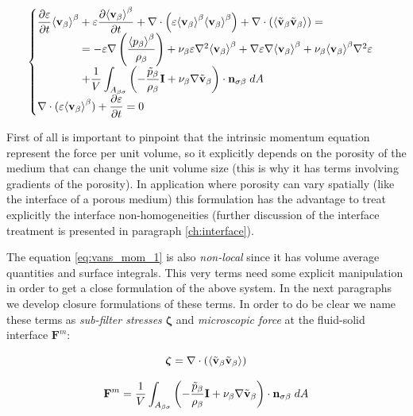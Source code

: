 \begin{eqnarray}
\begin{cases}
 \dfrac{\partial \varepsilon}{\partial t}{\left< \textbf{v}_{\beta} \right>}^{\beta} + \varepsilon \dfrac{\partial {\left< \textbf{v}_{\beta}\right>}^{\beta}}{\partial t} + \nabla \cdot \left(\varepsilon {\left< \textbf{v}_{\beta}\right>}^{\beta}{\left< \textbf{v}_{\beta} \right>}^{\beta}\right)   + \nabla \cdot \left({\left< \tilde{\textbf{v}}_{\beta} \tilde{\textbf{v}}_{\beta} \right>}\right) =  \\
\qquad \qquad = -\varepsilon \nabla \left(\dfrac{{\left< p_{\beta} \right>}^{\beta}}{\rho_{\beta}}\right) + \nu_{\beta} \varepsilon \nabla^2 {\left< \textbf{v}_{\beta} \right>}^{\beta} +  \nabla \varepsilon \nabla {\left< \textbf{v}_{\beta}\right>}^{\beta} + \nu_{\beta} {\left< \textbf{v}_{\beta} \right>}^{\beta} \nabla^2 \varepsilon  \\
\qquad \qquad + \dfrac{1}{V} \displaystyle\int_{A_{\beta \sigma}} \left(-\dfrac{\tilde{p}_{\beta}}{\rho_{\beta}} \mathbf{I}  + \nu_{\beta} \nabla \tilde{\textbf{v}}_{\beta} \right)\cdot \mathbf{n}_{\sigma \beta} \;dA \\
 \nabla \cdot (\varepsilon{\left< \textbf{v}_{\beta}\right>}^{\beta} ) + \dfrac{\partial \varepsilon}{\partial t}= 0 
\end{cases}
\label{eq:vans_mom_1}
\end{eqnarray}


First of all is important to pinpoint that the intrinsic momentum equation represent the force per unit volume, so it explicitly depends on the porosity of the medium that can change the unit volume size (this is why it has terms involving gradients of the porosity).
In application where porosity can vary spatially (like the interface of a porous medium) this formulation has the advantage to treat explicitly the interface non-homogeneities (further discussion of the interface treatment is presented in paragraph \ref{ch:interface}).


The equation \eqref{eq:vans_mom_1} is also \textit{non-local} since it has volume average quantities and surface integrals.
This very terms need some explicit manipulation in order to get a close formulation of the above system.
In the next paragraphs we develop closure formulations of these terms. In order to do be clear we name these terms as \textit{sub-filter stresses} $\boldsymbol{\zeta}$ and \textit{microscopic force} at the fluid-solid interface $\mathbf{F}^m$:

$$
\boldsymbol{\zeta} = \nabla \cdot \left({\left< \tilde{\textbf{v}}_{\beta} \tilde{\textbf{v}}_{\beta} \right>}\right)
$$

$$
\mathbf{F}^m =  \dfrac{1}{V} \int_{A_{\beta \sigma}} \left(-\dfrac{\tilde{p}_{\beta}}{\rho_{\beta}} \mathbf{I}  + \nu_{\beta} \nabla \tilde{\textbf{v}}_{\beta} \right)\cdot \mathbf{n}_{\sigma \beta} \;dA
$$

